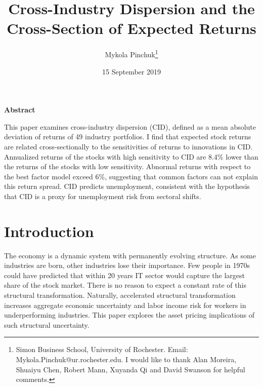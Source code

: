 \documentclass[12pt]{article}
\begin{document}
\onehalfspacing      %
\renewcommand{\footnote}{\endnote}  %

\author{\large{Mykola Pinchuk}\thanks{\rm Simon Business School, University of Rochester. Email: Mykola.Pinchuk@ur.rochester.edu. \newline I would like to thank Alan Moreira, Shuaiyu Chen, Robert Mann, Xuyanda Qi and David Swanson for helpful comments.}}

\title{\bf Cross-Industry Dispersion and the Cross-Section of Expected Returns}

\date{15 September 2019}  

\maketitle
\thispagestyle{empty}

\bigskip

\normalsize
\vspace{1cm}

\centerline{\bf Abstract}

\vspace{0.5cm}

\begin{onehalfspace}  %
  \noindent This paper examines cross-industry dispersion (CID), defined as a mean absolute deviation of returns of 49 industry portfolios. I find that expected stock returns are related cross-sectionally to the sensitivities of returns to innovations in CID. Annualized returns of the stocks with high sensitivity to CID are 8.4\% lower than the returns of the stocks with low sensitivity. Abnormal returns with respect to the best factor model exceed 6\%, suggesting that common factors can not explain this return spread. CID predicts unemployment, consistent with the hypothesis that CID is a proxy for unemployment risk from sectoral shifts.
\end{onehalfspace}
\medskip


\clearpage
{}


\section{Introduction} \label{sec:Model}
The economy is a dynamic system with permanently evolving structure. As some industries are born, other industries lose their importance. Few people in 1970s could have predicted that within 20 years IT sector would capture the largest share of the stock market. There is no reason to expect a constant rate of this structural transformation. Naturally, accelerated structural transformation increases aggregate economic uncertainty and labor income risk for workers in underperforming industries. This paper explores the asset pricing implications of such structural uncertainty.
\end{document}
